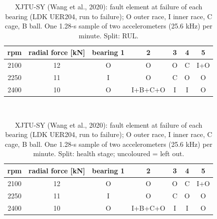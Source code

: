 \begin{table}[ht]
\centering
\footnotesize
\begin{tabular}{ccccccc}
\toprule
rpm & radial force [kN] & bearing 1 & 2 & 3 & 4 & 5 \\
\midrule
2100 & 12 & \cellcolor{trainc}O & \cellcolor{trainc}O & \cellcolor{trainc}O & \cellcolor{trainc}C & \cellcolor{testc}I+O \\
2250 & 11 & \cellcolor{trainc}I & \cellcolor{trainc}O & \cellcolor{trainc}C & \cellcolor{trainc}O & \cellcolor{testc}O \\
2400 & 10 & \cellcolor{trainc}O & \cellcolor{trainc}I+B+C+O & \cellcolor{trainc}I & \cellcolor{trainc}I & \cellcolor{testc}O \\
\bottomrule
\end{tabular}
\\[4pt] \splitlegend
\caption{XJTU-SY (Wang et al., 2020): fault element at failure of each bearing (LDK UER204, run to failure); O outer race, I inner race, C cage, B ball. One 1.28-s sample of two accelerometers (25.6 kHz) per minute. Split: RUL.}
\end{table}




\begin{table}[ht]
\centering
\footnotesize
\begin{tabular}{ccccccc}
\toprule
rpm & radial force [kN] & bearing 1 & 2 & 3 & 4 & 5 \\
\midrule
2100 & 12 & \cellcolor{trainc}O & \cellcolor{trainc}O & \cellcolor{trainc}O & \cellcolor{trainc}C & \cellcolor{testc}I+O \\
2250 & 11 & \cellcolor{trainc}I & \cellcolor{trainc}O & \cellcolor{trainc}C & \cellcolor{pretc}O & \cellcolor{testc}O \\
2400 & 10 & \cellcolor{trainc}O & \cellcolor{pretc}I+B+C+O & \cellcolor{trainc}I & \cellcolor{pretc}I & O \\
\bottomrule
\end{tabular}
\\[4pt] \splitlegend
\caption{XJTU-SY (Wang et al., 2020): fault element at failure of each bearing (LDK UER204, run to failure); O outer race, I inner race, C cage, B ball. One 1.28-s sample of two accelerometers (25.6 kHz) per minute. Split: health stage; uncoloured = left out.}
\end{table}


